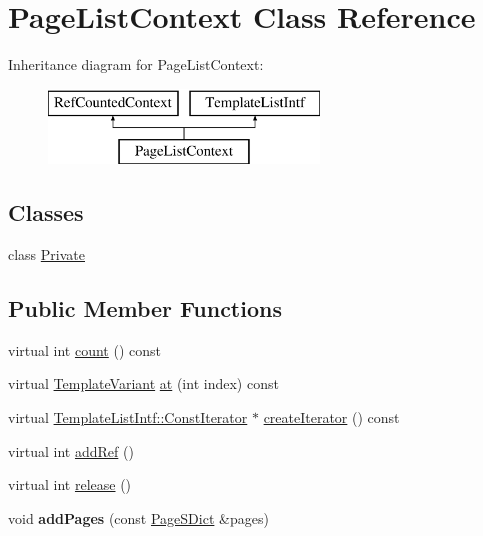 \hypertarget{class_page_list_context}{}\section{Page\+List\+Context Class Reference}
\label{class_page_list_context}
Inheritance diagram for Page\+List\+Context\+:\begin{figure}[H]
\begin{center}
\leavevmode
\includegraphics[height=2.000000cm]{class_page_list_context}
\end{center}
\end{figure}
\subsection*{Classes}
\begin{DoxyCompactItemize}
\item 
class \mbox{\hyperlink{class_page_list_context_1_1_private}{Private}}
\end{DoxyCompactItemize}
\subsection*{Public Member Functions}
\begin{DoxyCompactItemize}
\item 
virtual int \mbox{\hyperlink{class_page_list_context_aeb9332b426d2dc8639fbbbbc1f54b30c}{count}} () const
\item 
virtual \mbox{\hyperlink{class_template_variant}{Template\+Variant}} \mbox{\hyperlink{class_page_list_context_adb8538bc8c1206e15372209d7e3379dc}{at}} (int index) const
\item 
virtual \mbox{\hyperlink{class_template_list_intf_1_1_const_iterator}{Template\+List\+Intf\+::\+Const\+Iterator}} $\ast$ \mbox{\hyperlink{class_page_list_context_ac137e9b79bdc80c05ce4030c59c5057b}{create\+Iterator}} () const
\item 
virtual int \mbox{\hyperlink{class_page_list_context_afd248c2c11a415e6e62150580d3ec366}{add\+Ref}} ()
\item 
virtual int \mbox{\hyperlink{class_page_list_context_aec001e0a201e3d1c168a67c80ffc8f06}{release}} ()
\item 
\mbox{\label{class_page_list_context_a591d4a2e5eb5827755d0d944482d51b8}} 
void {\bfseries add\+Pages} (const \mbox{\hyperlink{class_page_s_dict}{Page\+S\+Dict}} \&pages)
\end{DoxyCompactItemize}
